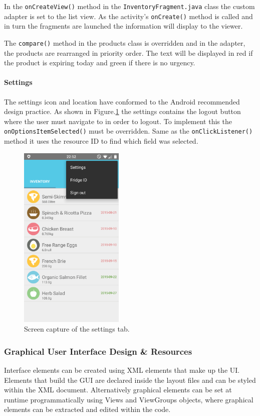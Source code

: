 \documentclass[a4paper, 11pt]{article}
\begin{document}
In the \texttt {onCreateView()} method in the \texttt{InventoryFragment.java} class the custom adapter is set to the list view. As the activity's \texttt{onCreate()} method is called and in turn the fragments are launched the information will display to the viewer. 

The \texttt{compare()} method in the products class is overridden and in the adapter, the products are rearranged in priority order. The text will be displayed in red if the product is expiring today and green if there is no urgency. 

\paragraph{Settings} 
The settings icon and location have conformed to the Android recommended design practice. As shown in Figure.\ref{fig:settings} the settings contains the logout button where the user must navigate to in order to logout. To implement this the \texttt{onOptionsItemSelected()} must be overridden. Same as the \texttt{onClickListener()} method it uses the resource ID to find which field was selected. 

\begin{figure}[!htbp]
\centering
\includegraphics[width=5cm]{settings}
\caption{Screen capture of the settings tab.} \label{fig:settings}
\end{figure}

\vspace{\baselineskip}

\subsubsection{Graphical User Interface Design \& Resources}
Interface elements can be created using XML elements that make up the UI. Elements that build the GUI are declared inside the layout files and can be styled within the XML document. Alternatively graphical elements can be set at runtime programmatically using Views and ViewGroups objects, where graphical elements can be extracted and edited within the code. 
\end{document}
